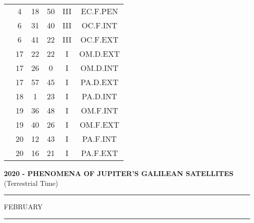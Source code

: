 \documentclass[12pt, a4paper]{article}
\begin{document}
\begin{multicols}{3}
{\begin{tabular}{c c c c c c}
	 	 	 	 & 4 & 18 & 50 & III & EC.F.PEN\\%
	 	 	 	 & 6 & 31 & 40 & III & OC.F.INT\\%
	 	 	 	 & 6 & 41 & 22 & III & OC.F.EXT\\%
	 	 	 	 & 17 & 22 & 22 & I & OM.D.EXT\\%
	 	 	 	 & 17 & 26 & 0 & I & OM.D.INT\\%
	 	 	 	 & 17 & 57 & 45 & I & PA.D.EXT\\%
	 	 	 	 & 18 & 1 & 23 & I & PA.D.INT\\%
	 	 	 	 & 19 & 36 & 48 & I & OM.F.INT\\%
	 	 	 	 & 19 & 40 & 26 & I & OM.F.EXT\\%
	 	 	 	 & 20 & 12 & 43 & I & PA.F.INT\\%
	 	 	 	 & 20 & 16 & 21 & I & PA.F.EXT\\%
	 	 \end{tabular}
 	}
\end{multicols}
\textbf{2020 - PHENOMENA OF JUPITER'S GALILEAN SATELLITES}\\(Terrestrial Time) 
\vspace{0.1cm} \hrule \vspace{0.1cm}
FEBRUARY\vspace{0.1cm}
\hrule
\vspace{-0.2cm}
\end{document}
